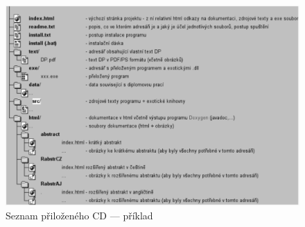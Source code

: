 \documentclass[12pt,twoside,a4paper]{book}   %
\begin{document}
\begin{figure}[h]
\begin{center}
\includegraphics[width=14cm]{figures/seznamcd}
\caption{Seznam přiloženého CD --- příklad}
\label{fig:seznamcd}
\end{center}
\end{figure}
\end{document}
